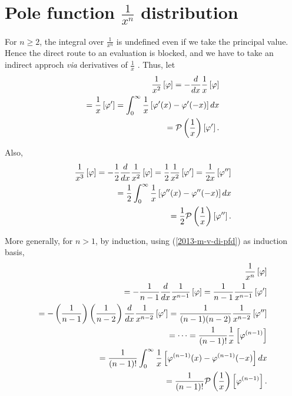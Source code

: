 \section{Pole function $\frac{1}{x^n}$ distribution}

For $n\ge 2$, the integral over $\frac{1}{x^n}$ is undefined even if we take the principal value.
Hence the direct route to an evaluation is blocked, and we have to take an indirect approch {\it via}
derivatives of $\frac{1}{x}$ \cite{sommer-di}.
Thus, let
\begin{equation}
\begin{split}
\frac{1}{x^2} \left[ \varphi \right]
=
-\frac{d}{dx} \frac{1}{x} \left[ \varphi \right] \\
=\frac{1}{x} \left[ \varphi ' \right] =
\int_0^{\infty}  \frac{1}{x}  \left[  \varphi'(x)
-
   \varphi'(-x) \right] dx
\\
 =
{\cal P} \left(\frac{1}{x}\right) \left[\varphi ' \right]
 .
\end{split}
\label{2013-m-v-di-pfd}
\end{equation}

Also,
\begin{equation}
\begin{split}
\frac{1}{x^3} \left[ \varphi \right]
=
-\frac{1}{2}\frac{d}{dx} \frac{1}{x^2} \left[ \varphi \right]
=\frac{1}{2}\frac{1}{x^2} \left[ \varphi ' \right] =  \frac{1}{2x} \left[ \varphi '' \right]\\
=
\frac{1}{2} \int_0^{\infty}  \frac{1}{x}  \left[  \varphi''(x)
-
   \varphi''(-x) \right] dx
\\
 =
\frac{1}{2} {\cal P} \left(\frac{1}{x}\right) \left[\varphi '' \right]
 .
\label{2013-m-v-di-pfd3}
\end{split}
\end{equation}


More generally, for $n>1$, by induction, using (\ref{2013-m-v-di-pfd}) as induction basis,
\begin{equation}
\begin{split}
\frac{1}{x^n} \left[ \varphi \right]  \\
=
-\frac{1}{n-1}\frac{d}{dx} \frac{1}{x^{n-1}} \left[ \varphi \right]
=
 \frac{1}{n-1}  \frac{1}{x^{n-1}} \left[ \varphi' \right]  \\
=
-\left( \frac{1}{n-1} \right) \left(\frac{1}{n-2}\right) \frac{d}{dx} \frac{1}{x^{n-2}} \left[ \varphi' \right]
=
 \frac{1}{(n-1)(n-2)}   \frac{1}{x^{n-2}} \left[ \varphi'' \right]  \\
=   \cdots =
\frac{1}{(n-1)!} \frac{1}{x} \left[ \varphi^{({n-1})} \right]  \\
=\frac{1}{(n-1)!}
\int_0^{\infty}  \frac{1}{x}  \left[  \varphi^{(n-1)}(x)
-
   \varphi^{(n-1)}(-x) \right] dx
\\
 =
\frac{1}{(n-1)!} {\cal P} \left(\frac{1}{x}\right) \left[\varphi^{(n-1)} \right]
 .
\end{split}
\end{equation}




